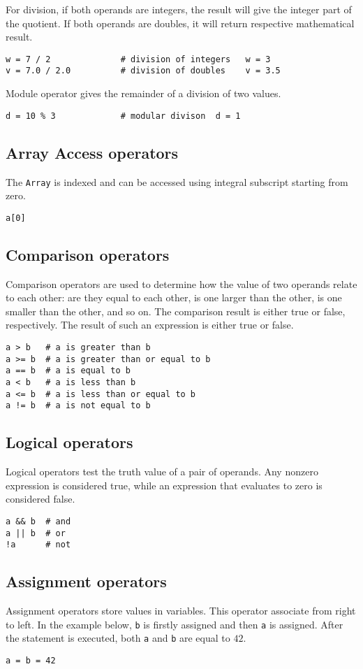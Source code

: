 \documentclass[11pt]{article}
\begin{document}
For division, if both operands are integers, the result will give the integer part of the quotient. If both operands are doubles, it will return respective mathematical result. 
\begin{lstlisting}
w = 7 / 2              # division of integers   w = 3
v = 7.0 / 2.0          # division of doubles    v = 3.5
\end{lstlisting}

Module operator gives the remainder of a division of two values.
\begin{lstlisting}
d = 10 % 3             # modular divison  d = 1
\end{lstlisting}

\subsection{Array Access operators}
The \texttt{Array} is indexed and can be accessed using integral subscript starting from zero.
\begin{lstlisting}
a[0]
\end{lstlisting}

\subsection{Comparison operators} %
Comparison operators are used to determine how the value of two operands relate to each other: are they equal to each other, is one larger than the other, is one smaller than the other, and so on. The comparison result is either true or false, respectively.
The result of such an expression is either true or false.
\begin{lstlisting}
a > b   # a is greater than b
a >= b  # a is greater than or equal to b
a == b  # a is equal to b
a < b   # a is less than b
a <= b  # a is less than or equal to b
a != b  # a is not equal to b
\end{lstlisting}

\subsection{Logical operators} %
Logical operators test the truth value of a pair of operands. Any nonzero expression is considered true, while an expression that evaluates to zero is considered false.
\begin{lstlisting}
a && b  # and
a || b  # or
!a      # not
\end{lstlisting}

\subsection{Assignment operators} %
Assignment operators store values in variables. This operator associate from right to left. In the example below, \texttt{b} is firstly assigned and then \texttt{a} is assigned. After the statement is executed, both \texttt{a} and \texttt{b} are equal to $42$.
\begin{lstlisting}
a = b = 42
\end{lstlisting}
\end{document}
